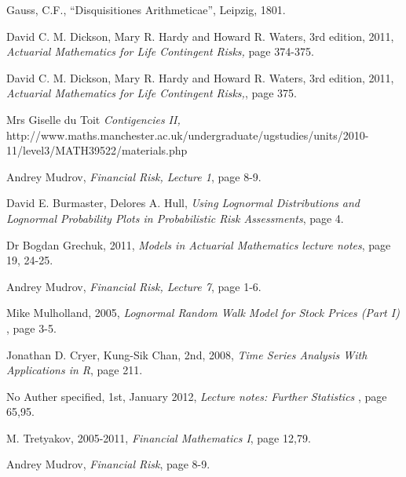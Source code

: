 \documentclass{report}
\begin{document}
\begin{thebibliography}{99}             %

 Gauss, C.F.,
    ``Disquisitiones Arithmeticae'', Leipzig, 1801.

  David C. M. Dickson, Mary R. Hardy and Howard R. Waters,
    3rd edition, 2011, 
    {\em Actuarial Mathematics for Life Contingent Risks,}
    page 374-375.

  David C. M. Dickson, Mary R. Hardy and Howard R. Waters,
    3rd edition, 2011, 
    {\em Actuarial Mathematics for Life Contingent Risks,},
    page 375.



  Mrs Giselle du Toit
    {\em Contigencies II,}
    http://www.maths.manchester.ac.uk/undergraduate/ugstudies/units/2010-11/level3/MATH39522/materials.php



  Andrey Mudrov,
    {\em Financial Risk, Lecture 1},
    page 8-9.



  David E. Burmaster, Delores A. Hull,
    {\em Using Lognormal Distributions and Lognormal Probability Plots in Probabilistic Risk Assessments},
    page 4.




  Dr Bogdan Grechuk,
    2011,
    {\em Models in Actuarial Mathematics lecture notes},
    page 19, 24-25.








  Andrey Mudrov,
    {\em Financial Risk, Lecture 7},
    page 1-6.





  Mike Mulholland,
    2005, 
    {\em Lognormal Random Walk Model for Stock Prices (Part I) },
    page 3-5.

  Jonathan D. Cryer, Kung-Sik Chan,
    2nd, 2008, 
    {\em Time Series Analysis With Applications in R},
    page 211.

  No Auther specified,
    1st, January 2012, 
    {\em  Lecture notes: Further Statistics },
    page 65,95.


  M. Tretyakov,
    2005-2011,
    {\em Financial Mathematics I},
    page 12,79.


  Andrey Mudrov,
    {\em Financial Risk},
    page 8-9.






\end{thebibliography}
\end{document}
